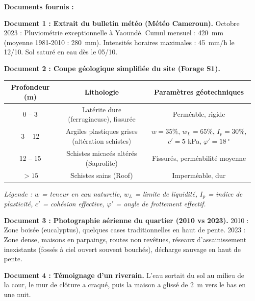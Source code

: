 \documentclass[11pt]{article}
\providecommand{\degree}{^{\circ}}
\begin{document}
\begin{exercice}
\textbf{Documents fournis :}

\textbf{Document 1 : Extrait du bulletin météo (Météo Cameroun).}
\og Octobre 2023 : Pluviométrie exceptionnelle à Yaoundé. Cumul mensuel : \SI{420}{mm} (moyenne 1981-2010 : \SI{280}{mm}). Intensités horaires maximales : \SI{45}{mm/h} le 12/10. Sol saturé en eau dès le 05/10. \fg

\textbf{Document 2 : Coupe géologique simplifiée du site (Forage S1).}
\begin{center}
\begin{tabular}{|c|c|c|}\hline
\textbf{Profondeur (m)} & \textbf{Lithologie} & \textbf{Paramètres géotechniques} \\ \hline
0 -- 3 & Latérite dure (ferrugineuse), fissurée & Perméable, rigide \\ \hline
3 -- 12 & Argiles plastiques grises (altération schistes) & $w = 35\%$, $w_L = 65\%$, $I_p = 30\%$, $c' = 5$ kPa, $\varphi' = \SI{18}{\degree}$ \\ \hline
12 -- 15 & Schistes micacés altérés (Saprolite) & Fissurés, perméabilité moyenne \\ \hline
$> 15$ & Schistes sains (Roof) & Imperméable, dur \\ \hline
\end{tabular}
\end{center}
\emph{Légende : $w$ = teneur en eau naturelle, $w_L$ = limite de liquidité, $I_p$ = indice de plasticité, $c'$ = cohésion effective, $\varphi'$ = angle de frottement effectif.}

\textbf{Document 3 : Photographie aérienne du quartier (2010 vs 2023).}
2010 : Zone boisée (eucalyptus), quelques cases traditionnelles en haut de pente.
2023 : Zone dense, maisons en parpaings, routes non revêtues, réseaux d'assainissement inexistants (fossés à ciel ouvert souvent bouchés), décharge sauvage en haut de pente.

\textbf{Document 4 : Témoignage d'un riverain.}
\og L'eau sortait du sol au milieu de la cour, le mur de clôture a craqué, puis la maison a glissé de \SI{2}{m} vers le bas en une nuit. \fg


\end{exercice}
\end{document}
